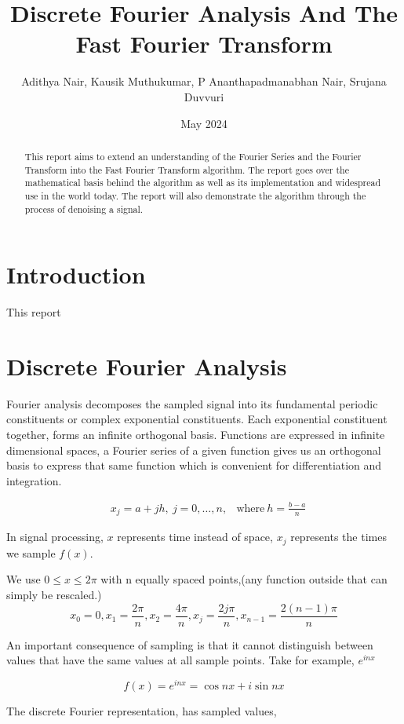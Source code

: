 \documentclass[11pt]{amsart}
\title{Discrete Fourier Analysis And The Fast Fourier Transform}
\author{Adithya Nair, Kausik Muthukumar, P Ananthapadmanabhan Nair, Srujana Duvvuri}
\date{May 2024}
\theoremstyle{definition}
\theoremstyle{remark}
\numberwithin{equation}{section}
\begin{document}
\begin{abstract}
	This report aims to extend an understanding of the Fourier Series and the Fourier Transform into the Fast Fourier Transform algorithm. The report goes over the mathematical basis behind the algorithm as well as its implementation and widespread use in the world today. The report will also demonstrate the algorithm through the process of denoising a signal.
\end{abstract}

\maketitle

\section{Introduction}\label{sec1}
This report  

\section{Discrete Fourier Analysis}
Fourier analysis decomposes the sampled signal into its fundamental periodic constituents or complex exponential constituents. Each exponential constituent together, forms an infinite orthogonal basis. Functions are expressed in infinite dimensional spaces, a Fourier series of a given function gives us an orthogonal basis to express that same function which is convenient for differentiation and integration.

\begin{align*}
	&x_j = a + jh, \ j = 0, \dots, n, & \text{where} \ h = \frac{b-a}{n}
\end{align*}

In signal processing, $x$ represents time instead of space, $x_j$ represents the times we sample $f(x)$.

We use $0 \leq x \leq 2 \pi$ with n equally spaced points,(any function outside that can simply be rescaled.)
\[ 
	x_0 = 0, x_1 = \frac{2\pi}{n}, x_2 = \frac{4\pi}{n}, x_j = \frac{2j\pi}{n}, x_{n-1} = \frac{2(n-1)\pi}{n}
\]

An important consequence of sampling is that it cannot distinguish between values that have the same values at all sample points.
Take for example, $e^{inx}$

\[
	f(x) = e^{inx} = \cos{nx} + i \sin{nx}
\]


The discrete Fourier representation, has sampled values,
\end{document}
